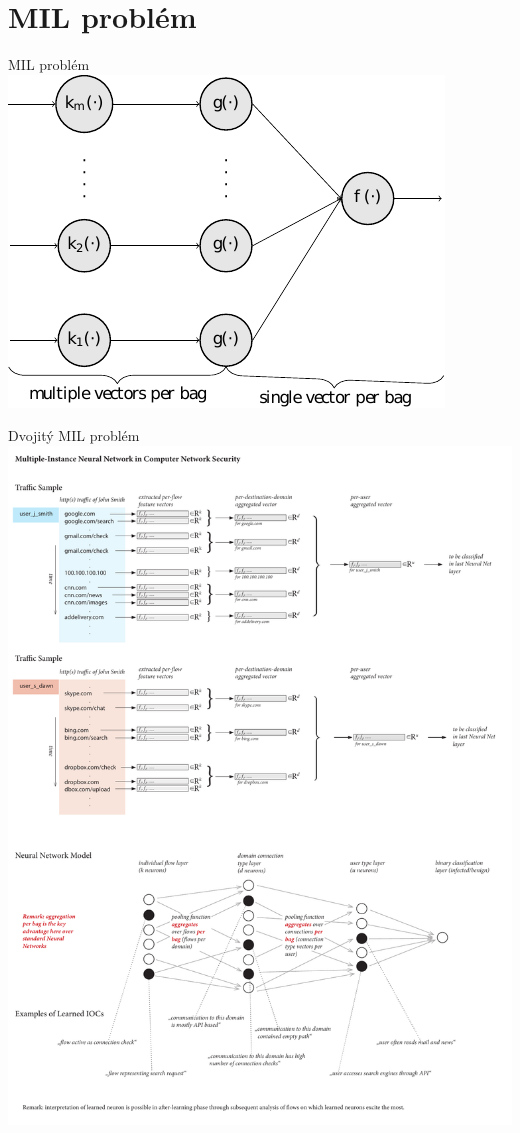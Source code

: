 \documentclass[10pt]{beamer}
\begin{document}
\section{MIL problém}
\begin{frame}{MIL problém}
	\centering
	\includegraphics[width=0.7\columnwidth]{images/MIL.pdf}

	\cite{pevny_using_2016}
\end{frame}

\begin{frame}[label=doubleMIL]{Dvojitý MIL problém}
	\centering
	\includegraphics[width=0.9\columnwidth]{images/traffic.pdf}

	\cite{pevny_discriminative_2016}
\end{frame}
\end{document}
